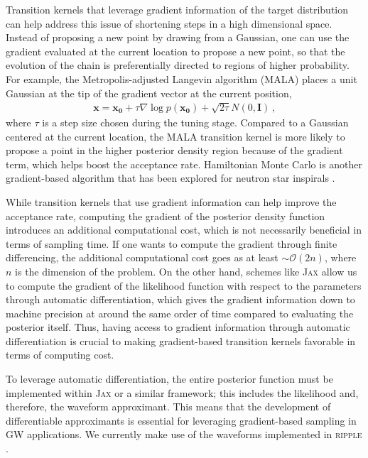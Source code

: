 \documentclass[twocolumn]{aastex631}
\begin{document}
Transition kernels that leverage gradient information of the target
distribution can help address this issue of shortening steps in a high
dimensional space. Instead of proposing a new point by drawing from a Gaussian,
one can use the gradient evaluated at the current location to propose a new
point, so that the evolution of the chain is preferentially directed to regions
of higher probability. For example, the Metropolis-adjusted Langevin algorithm
(MALA) \citep{10.2307/2346184} places a unit Gaussian at the tip of the gradient
vector at the current position,
\begin{align}
    \mathbf{x} = \mathbf{x_0} + \tau \nabla\log{p(\mathbf{x_0})} + \sqrt{2\tau}N(0,\mathbf{I})\, ,
\end{align}
where $\tau$ is a step size chosen during the tuning stage. Compared to a
Gaussian centered at the current location, the MALA transition kernel is more
likely to propose a point in the higher posterior density region because of the
gradient term, which helps boost the acceptance rate.
Hamiltonian Monte Carlo \citep{2017arXiv170102434B} is another gradient-based
algorithm that has been explored for neutron star inspirals
\citep{Bouffanais:2018hoz}.

While transition kernels that use gradient information can help improve the
acceptance rate, computing the gradient of the posterior density function
introduces an additional computational cost, which is not necessarily
beneficial in terms of sampling time. If one wants to compute the gradient
through finite differencing, the additional computational cost goes as at least
${\sim} \mathcal{O}(2n)$, where $n$ is the dimension of the problem. On the
other hand, schemes like \textsc{Jax}
\citep{jax2018github} allow us to compute the gradient of the likelihood
function with respect to the parameters through automatic differentiation,
which gives the gradient information down to machine precision at around the
same order of time compared to evaluating the posterior itself. Thus, having
access to gradient information through automatic differentiation is crucial to
making gradient-based transition kernels favorable in terms of computing cost.

To leverage automatic differentiation, the entire posterior function must be
implemented within \textsc{Jax} or a similar framework; this includes the
likelihood and, therefore, the waveform approximant.  This means that the
development of differentiable approximants is essential for leveraging
gradient-based sampling in GW applications. We currently make use of the
waveforms implemented in \textsc{ripple} \citep{ripplepaper}.
\end{document}
